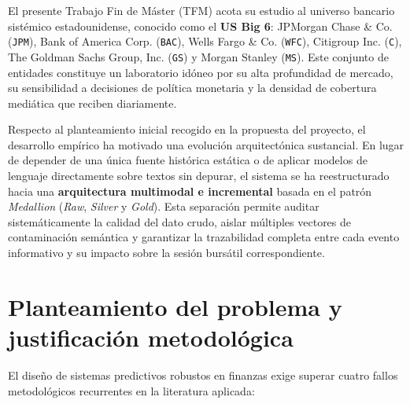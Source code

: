 \documentclass[11pt, a4paper]{report}
\begin{document}
El presente Trabajo Fin de Máster (TFM) acota su estudio al universo bancario sistémico estadounidense, conocido como el \textbf{US Big 6}: JPMorgan Chase \& Co. (\texttt{JPM}), Bank of America Corp. (\texttt{BAC}), Wells Fargo \& Co. (\texttt{WFC}), Citigroup Inc. (\texttt{C}), The Goldman Sachs Group, Inc. (\texttt{GS}) y Morgan Stanley (\texttt{MS}). Este conjunto de entidades constituye un laboratorio idóneo por su alta profundidad de mercado, su sensibilidad a decisiones de política monetaria y la densidad de cobertura mediática que reciben diariamente.

Respecto al planteamiento inicial recogido en la propuesta del proyecto, el desarrollo empírico ha motivado una evolución arquitectónica sustancial. En lugar de depender de una única fuente histórica estática o de aplicar modelos de lenguaje directamente sobre textos sin depurar, el sistema se ha reestructurado hacia una \textbf{arquitectura multimodal e incremental} basada en el patrón \textit{Medallion} (\textit{Raw}, \textit{Silver} y \textit{Gold}). Esta separación permite auditar sistemáticamente la calidad del dato crudo, aislar múltiples vectores de contaminación semántica y garantizar la trazabilidad completa entre cada evento informativo y su impacto sobre la sesión bursátil correspondiente.

\section{Planteamiento del problema y justificación metodológica}
El diseño de sistemas predictivos robustos en finanzas exige superar cuatro fallos metodológicos recurrentes en la literatura aplicada:
\end{document}
